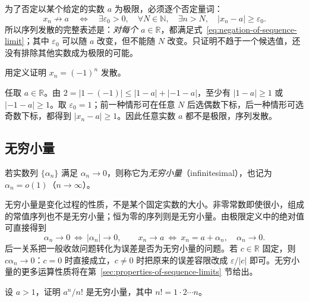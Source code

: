 为了否定以某个给定的实数 $a$ 为极限，必须逐个否定量词：
\begin{equation}
    x_n\not\to a
    \quad\Longleftrightarrow\quad
    \exists\varepsilon_0>0,\quad\forall N\in\mathbb{N},\quad
    \exists n>N,\quad |x_n-a|\geq\varepsilon_0.
    \label{eq:negation-of-sequence-limit}
\end{equation}
所以序列发散的完整表述是：\emph{对每个 $a\in\mathbb{R}$}，都满足式~\eqref{eq:negation-of-sequence-limit}；其中 $\varepsilon_0$ 可以随 $a$ 改变，但不能随 $N$ 改变。只证明不趋于一个候选值，还没有排除其他实数成为极限的可能。

\begin{example}
\label{ex:alternating-sequence-divergence-by-definition}
用定义证明 $x_n=(-1)^n$ 发散。
\end{example}

\begin{solve}
任取 $a\in\mathbb{R}$。由 $2=|1-(-1)|\leq|1-a|+|-1-a|$，至少有 $|1-a|\geq1$ 或 $|-1-a|\geq1$。取 $\varepsilon_0=1$；前一种情形可在任意 $N$ 后选偶数下标，后一种情形可选奇数下标，都得到 $|x_n-a|\geq1$。因此任意实数 $a$ 都不是极限，序列发散。
\end{solve}

\subsection{无穷小量}
\label{subsec:infinitesimal-sequences}

\begin{definition}
\label{def:infinitesimal-sequence}
若实数列 $\{\alpha_n\}$ 满足 $\alpha_n\to0$，则称它为\emph{无穷小量}（infinitesimal），也记为 $\alpha_n=o(1)$（$n\to\infty$）。
\end{definition}

无穷小量是变化过程的性质，不是某个固定实数的大小。非零常数即使很小，组成的常值序列也不是无穷小量；恒为零的序列则是无穷小量。由极限定义中的绝对值可直接得到
\begin{equation}
    \alpha_n\to0\ \Longleftrightarrow\ |\alpha_n|\to0,
    \qquad
    x_n\to a\ \Longleftrightarrow\ x_n=a+\alpha_n,\quad\alpha_n\to0.
    \label{eq:sequence-limit-and-infinitesimal-error}
\end{equation}
后一关系把一般收敛问题转化为误差是否为无穷小量的问题。若 $c\in\mathbb{R}$ 固定，则 $c\alpha_n\to0$：$c=0$ 时直接成立，$c\neq0$ 时把原来的误差容限改成 $\varepsilon/|c|$ 即可。无穷小量的更多运算性质将在第~\ref{sec:properties-of-sequence-limits} 节给出。

\begin{example}
\label{ex:factorial-dominates-geometric-sequence}
设 $a>1$，证明 $a^n/n!$ 是无穷小量，其中 $n!=1\cdot2\cdots n$。
\end{example}

